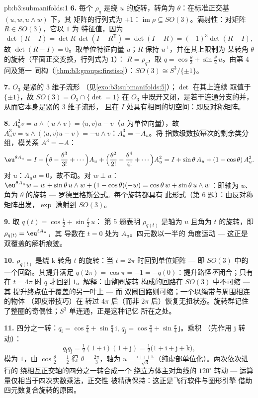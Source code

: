 \begin{solution}{pb:b3:submanifolds:1}
\textbf{6.} 每个 $\rho_q$ 是绕 $u$ 的旋转，转角为
$\theta$：在标准正交基 $(u, w, u\wedge w)$ 下，其
矩阵的行列式为 $+1$：$\operatorname{im}\rho \subseteq
SO(3)$。满射性：对矩阵 $R \in SO(3)$，它以 $1$ 为
特征值，因为
\[
\det(R - I) = \det R\,\det(I - R^{\mathsf T}) = \det(I - R)
= (-1)^3\det(R - I),
\]
故 $\det(R - I) = 0$。取单位特征向量 $u$；$R$
保持 $u^\perp$，并在其上限制为
某转角 $\theta$ 的旋转（平面正交变换，行列式为 $1$）：
$R = \rho_q$，取 $q = \cos\frac\theta2 +
\sin\frac\theta2\,u$。由第 4 问及第一
同构（\cref{thm:b3:groups:firstiso}）：$SO(3)
\cong S^3/\{\pm1\}$。

\textbf{7.} $O_3$ 是紧的 $3$ 维子流形
（见\cref{exo:b3:submanifolds:5}）；$\det$ 在其上连续
取值于 $\{\pm1\}$，故 $SO(3) = O_3\cap\{\det = 1\}$
在 $O_3$ 中既开又闭，是若干连通分支的并，
从而它本身是紧的 $3$ 维子流形，
且在 $I$ 处具有相同的切空间：即反对称矩阵。

\textbf{8.} $A_u^2v = u\wedge(u\wedge v) = \langle u,
v\rangle u - v$（$u$ 为单位向量），故 $A_u^3v = u\wedge(\langle
u,v\rangle u - v) = -u\wedge v$：$A_u^3 = -A_u$。将
指数级数按幂次的剩余类分组，模关系
$A^3 = -A$：
\[
\eu^{\theta A_u} = I + \Bigl(\theta - \frac{\theta^3}{3!} +
\cdots\Bigr)A_u + \Bigl(\frac{\theta^2}{2!} -
\frac{\theta^4}{4!} + \cdots\Bigr)A_u^2
= I + \sin\theta\,A_u + (1 - \cos\theta)\,A_u^2 .
\]
对 $u$：$A_uu = 0$，故不动。对 $w \perp u$：$\eu^{\theta
A_u}w = w + \sin\theta\,u\wedge w + (1 - \cos\theta)(-w) =
\cos\theta\,w + \sin\theta\,u\wedge w$：即轴为
$u$、角为 $\theta$ 的旋转 --- 罗德里格斯公式。每个旋转都具有
此形式（第 6 题）：由反对称
矩阵出发，$\exp$ 满射到 $SO(3)$。

\textbf{9.} 取 $q(t) = \cos\frac t2 + \sin\frac t2\,u$：
第 5 题表明 $\rho_{q(t)}$ 是轴为 $u$
且角为 $t$ 的旋转，即 $\rho_{q(t)} = \eu^{tA_u}$，其
导数在 $t = 0$ 处为 $A_u$。四元数以一半的
角度运动 --- 这正是双覆盖的解析痕迹。

\textbf{10.} $\rho_{q(t)}$ 是绕 $\mathrm k$
转角 $t$ 的旋转：当 $t = 2\pi$ 时回到单位矩阵 ---
即 $SO(3)$ 中的一个回路。其提升满足 $q(2\pi) = \cos\pi =
-1 = -q(0)$：提升路径\emph{不}闭合；只有在
$t = 4\pi$ 时 $q$ 才回到 $1$。解释：由整圈旋转
构成的回路在 $SO(3)$ 中不可缩 --- 其
提升终点位于覆盖的另一叶上 --- 而
双圈回路则可缩；一个以绳带与周围相连的物体
（即皮带技巧）在
转过 $4\pi$ 后（而非 $2\pi$ 后）恢复无扭状态。旋转群记住
了整圈的奇偶性；$S^3$ 单连通，正是这种记忆
所在之处。

\textbf{11.} 四分之一转：$q_{\mathrm i} =
\cos\frac\pi4 + \sin\frac\pi4\,\mathrm i$, $q_{\mathrm j} =
\cos\frac\pi4 + \sin\frac\pi4\,\mathrm j$。乘积
（先作用 $\mathrm j$ 转动）：
\[
q_{\mathrm i}q_{\mathrm j} = \tfrac12(1 + \mathrm i)(1 +
\mathrm j) = \tfrac12\bigl(1 + \mathrm i + \mathrm j +
\mathrm k\bigr),
\]
模为 $1$，由 $\cos\frac\theta2 = \frac12$ 得 $\theta =
\frac{2\pi}3$，轴为 $u = \frac{\mathrm i + \mathrm j +
\mathrm k}{\sqrt3}$（纯虚部单位化）。两次依次进行的
绕相互正交轴的四分之一转合成一个
绕立方体主对角线的 $120^\circ$ 转动 --- 运算
量仅相当于四次实数乘法，正交性
被精确保持：这正是飞行软件与图形引擎
借助四元数复合旋转的原因。


\end{solution}
